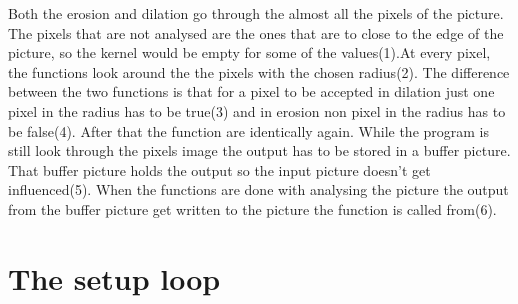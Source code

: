 Both the erosion and dilation go through the almost all the pixels of the picture. The pixels that are not analysed are the ones that are to close to the edge of the picture, so the kernel would be empty for some of the values(1).At every pixel, the functions look around the the pixels with the chosen radius(2). The difference between the two functions is that for a pixel to be accepted in  dilation just one pixel in the radius has to be true(3) and in erosion non pixel in the radius has to be false(4). After that the function are identically again. While the program is still look through the pixels image the output has to be stored in a buffer picture. That buffer picture holds the output so the input picture doesn't get influenced(5). When the functions are done with analysing the picture the output from the buffer picture get written to the picture the function is called from(6). 

\section{The setup loop}

